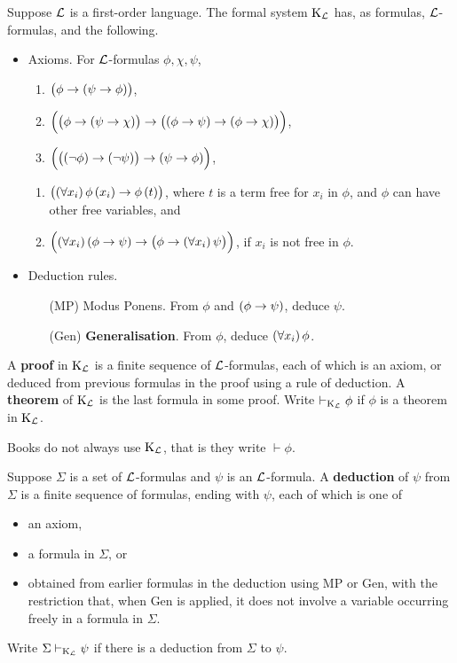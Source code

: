 \begin{definition}
Suppose $ \mathcal{L} $ is a first-order language. The formal system $ \mathrm{K}_{\mathcal{L}} $ has, as formulas, $ \mathcal{L} $-formulas, and the following.
\begin{itemize}
\item Axioms. For $ \mathcal{L} $-formulas $ \phi, \chi, \psi $,
\begin{enumerate}[label=(A\arabic*)]
\item $ \impb{\phi}{\impb{\psi}{\phi}} $,
\item $ \impb{\impb{\phi}{\impb{\psi}{\chi}}}{\impb{\impb{\phi}{\psi}}{\impb{\phi}{\chi}}} $,
\item $ \impb{\impb{\notb{\phi}}{\notb{\psi}}}{\impb{\psi}{\phi}} $,
\end{enumerate}
\begin{enumerate}[label=(K\arabic*)]
\item $ \impb{\fab{x_i}\phi\br{x_i}}{\phi\br{t}} $, where $ t $ is a term free for $ x_i $ in $ \phi $, and $ \phi $ can have other free variables, and
\item $ \impb{\fab{x_i}\impb{\phi}{\psi}}{\impb{\phi}{\fab{x_i}\psi}} $, if $ x_i $ is not free in $ \phi $.
\end{enumerate}
\item Deduction rules.
\begin{itemize}
\item[(MP)] Modus Ponens. From $ \phi $ and $ \impb{\phi}{\psi} $, deduce $ \psi $.
\item[(Gen)] \textbf{Generalisation}. From $ \phi $, deduce $ \fab{x_i}\phi $.
\end{itemize}
\end{itemize}
A \textbf{proof} in $ \mathrm{K}_{\mathcal{L}} $ is a finite sequence of $ \mathcal{L} $-formulas, each of which is an axiom, or deduced from previous formulas in the proof using a rule of deduction. A \textbf{theorem} of $ \mathrm{K}_{\mathcal{L}} $ is the last formula in some proof. Write $ \vdash_{\mathrm{K}_{\mathcal{L}}} \phi $ if $ \phi $ is a theorem in $ \mathrm{K}_{\mathcal{L}} $.
\end{definition}

\begin{note*}
Books do not always use $ \mathrm{K}_{\mathcal{L}} $, that is they write $ \vdash \phi $.
\end{note*}

\begin{definition}
Suppose $ \Sigma $ is a set of $ \mathcal{L} $-formulas and $ \psi $ is an $ \mathcal{L} $-formula. A \textbf{deduction} of $ \psi $ from $ \Sigma $ is a finite sequence of formulas, ending with $ \psi $, each of which is one of
\begin{itemize}
\item an axiom,
\item a formula in $ \Sigma $, or
\item obtained from earlier formulas in the deduction using MP or Gen, with the restriction that, when Gen is applied, it does not involve a variable occurring freely in a formula in $ \Sigma $.
\end{itemize}
Write $ \Sigma \vdash_{\mathrm{K}_{\mathcal{L}}} \psi $ if there is a deduction from $ \Sigma $ to $ \psi $.
\end{definition}

